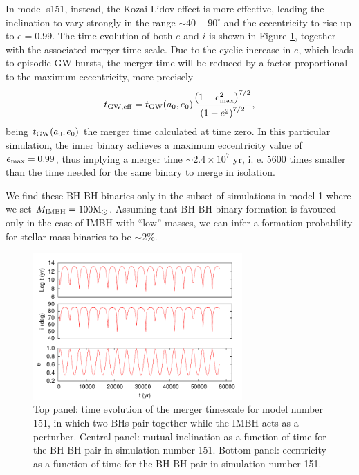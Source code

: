 \documentclass[twocolumn]{aastex62}
\newcommand{\Ms}{{\rm M}_\odot}
\newcommand{\gw}{{\rm GW}}
\newcommand{\ibh}{{\rm IMBH}}
\begin{document}
In model s151, instead, the Kozai-Lidov effect is more effective, leading the inclination to vary strongly in the range $\sim 40-90^\circ$ and the eccentricity to rise up to $e = 0.99$. The time evolution of both $e$ and $i$ is shown in Figure \ref{F9}, together with the associated merger time-scale. 
Due to the cyclic increase in $e$, which leads to episodic GW bursts, the merger time will be reduced by a factor proportional to the maximum eccentricity, more precisely \citep{antonini12}
\begin{equation}
t_{\gw, \rm eff} = t_{\gw}(a_0,e_0) \frac{\left(1-e_{\rm max}^2\right)^{7/2}}{\left(1-e^2\right)^{7/2}},
\end{equation}
being $t_{\gw}(a_0,e_0)$ the merger time calculated at time zero. In this particular simulation, the inner binary achieves a maximum eccentricity value of $e_{\rm max} = 0.99$, thus implying a merger time $\sim 2.4\times 10^7$ yr, i. e. $5600$ times smaller than the time needed for the same binary to merge in isolation.

We find these BH-BH binaries only in the subset of simulations in model 1 where we set $M_\ibh = 100\Ms$. Assuming that BH-BH binary formation is favoured only in the case of IMBH with ``low'' masses, we can infer a formation probability for stellar-mass binaries to be $\sim 2\%$. 


\begin{figure}
\centering 
\includegraphics[width=8cm]{kozai_151}
\caption{Top panel: time evolution of the merger timescale for model number 151, in which two BHs pair together while the IMBH acts as a perturber. Central panel: mutual inclination as a function of time for the BH-BH pair in simulation number 151. Bottom panel: ecentricity as a function of time for the BH-BH pair in simulation number 151.}
\label{F9}
\end{figure}
\end{document}
